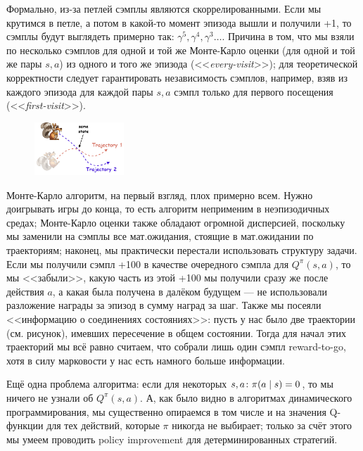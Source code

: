 \begin{remark}
Формально, из-за петлей сэмплы являются скоррелированными. Если мы крутимся в петле, а потом в какой-то момент эпизода вышли и получили +1, то сэмплы будут выглядеть примерно так: $\gamma^5, \gamma^4, \gamma^3 \dots$. Причина в том, что мы взяли по несколько сэмплов для одной и той же Монте-Карло оценки (для одной и той же пары $s, a$) из одного и того же эпизода (<<\emph{every-visit}>>); для теоретической корректности следует гарантировать независимость сэмплов, например, взяв из каждого эпизода для каждой пары $s, a$ сэмпл только для первого посещения (<<\emph{first-visit}>>).
\end{remark}

\begin{figure}
\vspace{-0.3cm}
\centering
\includegraphics[width=0.3\textwidth]{Images/TrajIntersect.png}
\vspace{-0.3cm}
\end{figure}

Монте-Карло алгоритм, на первый взгляд, плох примерно всем. Нужно доигрывать игры до конца, то есть алгоритм неприменим в неэпизодичных средах; Монте-Карло оценки также обладают огромной дисперсией, поскольку мы заменили на сэмплы все мат.ожидания, стоящие в мат.ожидании по траекториям; наконец, мы практически перестали использовать структуру задачи. Если мы получили сэмпл +100 в качестве очередного сэмпла для $Q^{\pi}(s, a)$, то мы <<забыли>>, какую часть из этой +100 мы получили сразу же после действия $a$, а какая была получена в далёком будущем --- не использовали разложение награды за эпизод в сумму наград за шаг. Также мы посеяли <<информацию о соединениях состояниях>>: пусть у нас было две траектории (см. рисунок), имевших пересечение в общем состоянии. Тогда для начал этих траекторий мы всё равно считаем, что собрали лишь один сэмпл reward-to-go, хотя в силу марковости у нас есть намного больше информации.

Ещё одна проблема алгоритма: если для некоторых $s, a \colon \pi(a \mid s) \HM= 0$, то мы ничего не узнали об $Q^\pi(s, a)$. А, как было видно в алгоритмах динамического программирования, мы существенно опираемся в том числе и на значения Q-функции для тех действий, которые $\pi$ никогда не выбирает; только за счёт этого мы умеем проводить policy improvement для детерминированных стратегий.


